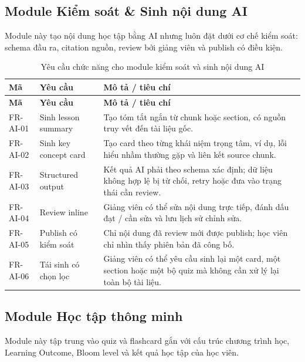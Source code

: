 \subsection{Module Kiểm soát \& Sinh nội dung AI}
\label{subsec:module-kiem-soat-sinh-noi-dung-ai}

Module này tạo nội dung học tập bằng AI nhưng luôn đặt dưới cơ chế kiểm soát:
schema đầu ra, citation nguồn, review bởi giảng viên và publish có điều kiện.

\begin{longtable}{|p{2.4cm}|p{5.1cm}|p{6.9cm}|}
\caption{Yêu cầu chức năng cho module kiểm soát và sinh nội dung AI}
\label{tab:fr-sinh-noi-dung-ai}\\
\hline
\textbf{Mã} & \textbf{Yêu cầu} & \textbf{Mô tả / tiêu chí} \\
\hline
\endfirsthead
\hline
\textbf{Mã} & \textbf{Yêu cầu} & \textbf{Mô tả / tiêu chí} \\
\hline
\endhead
FR-AI-01 & Sinh lesson summary & Tạo tóm tắt ngắn từ chunk hoặc section, có nguồn truy vết đến tài liệu gốc. \\
\hline
FR-AI-02 & Sinh key concept card & Tạo card theo từng khái niệm trọng tâm, ví dụ, lỗi hiểu nhầm thường gặp và liên kết source chunk. \\
\hline
FR-AI-03 & Structured output & Kết quả AI phải theo schema xác định; dữ liệu không hợp lệ bị từ chối, retry hoặc đưa vào trạng thái cần review. \\
\hline
FR-AI-04 & Review inline & Giảng viên có thể sửa nội dung trực tiếp, đánh dấu đạt / cần sửa và lưu lịch sử chỉnh sửa. \\
\hline
FR-AI-05 & Publish có kiểm soát & Chỉ nội dung đã review mới được publish; học viên chỉ nhìn thấy phiên bản đã công bố. \\
\hline
FR-AI-06 & Tái sinh có chọn lọc & Giảng viên có thể yêu cầu sinh lại một card, một section hoặc một bộ quiz mà không cần xử lý lại toàn bộ tài liệu. \\
\hline
\end{longtable}

\subsection{Module Học tập thông minh}
\label{subsec:module-hoc-tap-thong-minh}

Module này tập trung vào quiz và flashcard gắn với cấu trúc chương trình học,
Learning Outcome, Bloom level và kết quả học tập của học viên.

